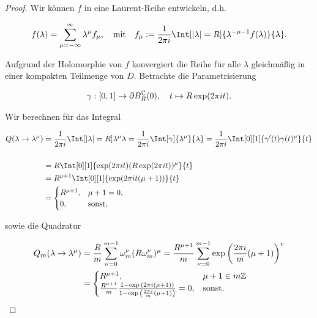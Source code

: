 \begin{proof}

    Wir können $f$ in eine Laurent-Reihe entwickeln, d.h.

    \begin{align*}
        f(\lambda) = \sum_{\mu = - \infty}^\infty \lambda^\mu f_\mu,
        \quad
        \text{mit}
        \quad
        f_\mu := \frac{1}{2\pi i} \Int[|\lambda| = R]{\lambda^{-\mu - 1} f(\lambda)}{\lambda}.
    \end{align*}

    Aufgrund der Holomorphie von $f$ konvergiert die Reihe für alle $\lambda$ gleichmäßig in einer kompakten Teilmenge von $D$.
    Betrachte die Parametrisierung

    \begin{align*}
        \gamma:
        [0,1] \to \partial B_R^{\mathbb{C}}(0), \quad
        t \mapsto R\exp(2\pi i t).
    \end{align*}

    Wir berechnen für das Integral

    \begin{align*}
        Q(\lambda \to \lambda^\mu)
        & =
        \frac{1}{2 \pi i}
        \Int[\abs{\lambda} = R]{\lambda^\mu}{\lambda}
         =
        \frac{1}{2 \pi i}
        \Int[\gamma]{\lambda^\mu}{\lambda}
         =
        \frac{1}{2 \pi i}
        \Int[0][1]{\gamma^\prime(t) \gamma(t)^\mu}{t} \\ \\
        & =
        R
        \Int[0][1]{\exp(2 \pi i t)(R \exp(2 \pi i t))^\mu}{t} \\
        & =
        R^{\mu + 1}
        \Int[0][1]{\exp(2\pi i t(\mu + 1))}{t} \\
        & =
        \begin{cases}
            R^{\mu + 1}, & \mu + 1 = 0, \\
            0,           & \text{sonst},
        \end{cases}
    \end{align*}

    sowie die Quadratur

    \begin{align*}
        Q_m(\lambda \to \lambda^\mu)
        & =
        \frac{R}{m}
        \sum_{\nu = 0}^{m - 1}
            \omega_m^\nu (R \omega_m^\nu)^\mu
        =
        \frac{R^{\mu + 1}}{m}
        \sum_{\nu = 0}^{m - 1}
            \exp {\left ( \frac{2\pi i}{m}(\mu + 1) \right )}^v \\
        & =
        \begin{cases}
            R^{\mu + 1},
            & \mu + 1 \in m \mathbb{Z} \\
            \frac{R^{\mu + 1}}{m}
            \frac
            {
                1 - \exp {\left ( 2 \pi i (\mu + 1) \right )}
            }{
                1 - \exp {\left ( \frac{2\pi i}{m}(\mu + 1) \right )}
            }
            =
            0,
            & \text{sonst}.
        \end{cases}
    \end{align*}


\end{proof}
